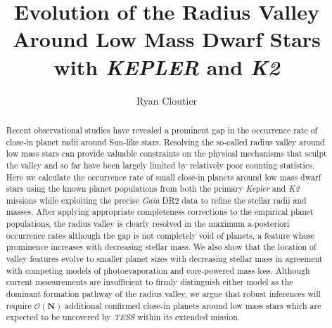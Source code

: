 \documentclass[twocolumn]{emulateapj}
\newcommand{\gaia}[1]{\emph{Gaia}#1}
\newcommand{\kepler}[1]{\emph{Kepler}#1}
\newcommand{\ktwo}[1]{\emph{K2}#1}
\newcommand{\tess}[1]{\emph{TESS}#1}
\begin{document}
\title{Evolution of the Radius Valley Around Low Mass Dwarf Stars with \emph{KEPLER} and \emph{K2}}
\author{Ryan Cloutier}



\begin{abstract}
  Recent observational studies have revealed a prominent gap in the occurrence rate
  of close-in planet radii around Sun-like stars.
  Resolving the so-called radius valley around low mass stars can provide valuable
  constraints on the physical mechanisms that sculpt the valley and so far have been largely limited
  by relatively poor counting statistics.
  Here we calculate the occurrence rate of small close-in planets around low mass dwarf stars
  using the known planet populations from both the primary \kepler{} and \ktwo{} missions while
  exploiting the precise \gaia{} DR2 data to refine the stellar radii and masses. 
  After applying appropriate completeness corrections to the empirical planet populations,
  the radius valley is clearly resolved in the maximum a-posteriori occurrence rates although
  the gap is not completely void of planets, a feature whose prominence increases with
  decreasing stellar mass. We also show that the location of valley features evolve to smaller
  planet sizes with decreasing stellar mass in agreement with competing models of photoevaporation
  and core-powered mass loss. Although current measurements are insufficient to
  firmly distinguish either model as the dominant formation pathway of the radius valley,
  we argue that robust inferences will require $\mathcal{O}(\mathbf{N})$
  additional confirmed close-in planets around low mass stars which are expected to be
  uncovered by \tess{} within its extended mission.
\end{abstract}
\end{document}
